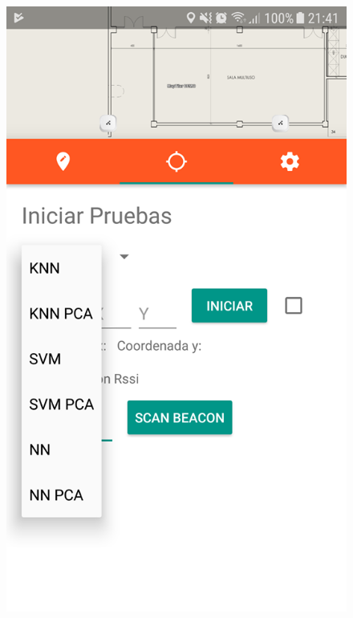 \documentclass[handout]{beamer}
\begin{document}
\begin{frame}
\begin{columns}[t]
\begin{figure}
\includegraphics[width=\textwidth]{../figures/fase_online1.png}
\end{figure}


\end{columns}
\end{frame}
\end{document}

